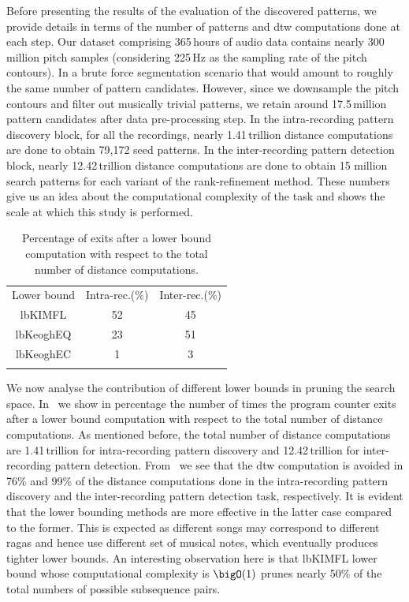 Before presenting the results of the evaluation of the discovered patterns, we provide details in terms of the number of patterns and \gls{dtw} computations done at each step. Our dataset comprising 365\,hours of audio data contains nearly 300\,million pitch samples (considering 225\,Hz as the sampling rate of the pitch contours). In a brute force segmentation scenario that would amount to roughly the same number of pattern candidates. However, since we downsample the pitch contours and filter out musically trivial patterns, we retain around 17.5\,million pattern candidates after data pre-processing step. In the intra-recording pattern discovery block, for all the recordings, nearly 1.41\,trillion distance computations are done to obtain 79,172 seed patterns. In the inter-recording pattern detection block, nearly 12.42\,trillion distance computations are done to obtain 15 million search patterns for each variant of the rank-refinement method. These numbers give us an idea about the computational complexity of the task and shows the scale at which this study is performed.

\begin{table} 
	\begin{centering}
		\begin{tabular}{ c | c c }
			\tabletop
			Lower bound   	& Intra-rec.(\%)		&	Inter-rec.(\%) \\	
			\tablemid
			\acrshort{lbKIMFL}   	& 52	&	45 \\	
			\acrshort{lbKeoghEQ}   	& 23	&	51 \\
			\acrshort{lbKeoghEC}   		& 1	&	3 \\
			\tablebot
		\end{tabular}
		\caption[Percentage of exits after different lower bound computations]{Percentage of exits after a lower bound computation with respect to the total number of distance computations.}
		\label{tab:computationalStats}	
		\par \end{centering}	
\end{table}

We now analyse the contribution of different lower bounds in pruning the search space. In~ we show in percentage the number of times the program counter exits after a lower bound computation with respect to the total number of distance computations. As mentioned before, the total number of distance computations are 1.41\,trillion for intra-recording pattern discovery and 12.42\,trillion for inter-recording pattern detection. From~ we see that the \gls{dtw} computation is avoided in 76\% and 99\% of the distance computations done in the intra-recording pattern discovery and the inter-recording pattern detection task, respectively. It is evident that the lower bounding methods are more effective in the latter case compared to the former. This is expected as different songs may correspond to different \glspl{raga} and hence use different set of musical notes, which eventually produces tighter lower bounds. An interesting observation here is that \acrshort{lbKIMFL} lower bound whose computational complexity is $\bigO(1)$ prunes nearly 50\% of the total numbers of possible subsequence pairs. 

